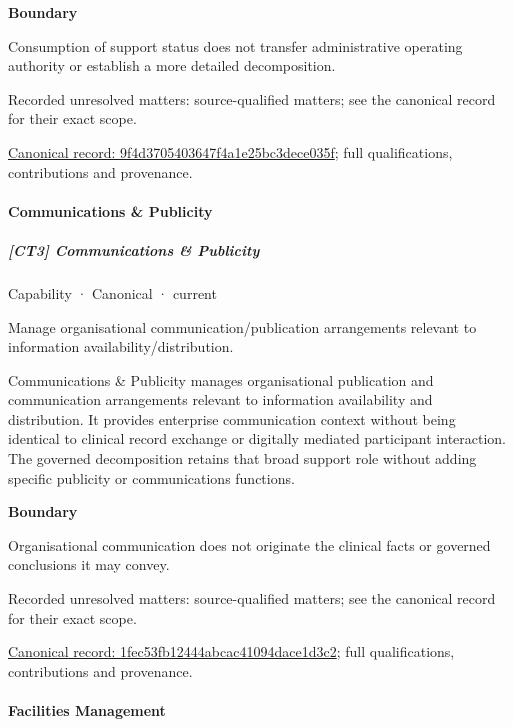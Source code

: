 \textbf{Boundary}



Consumption of support status does not transfer administrative operating authority or establish a more detailed decomposition.


{\small Recorded unresolved matters: source-qualified matters; see the canonical record for their exact scope.}\par
{\footnotesize \href{../../../../continuum/strategy/capability/9f4d3705403647f4a1e25bc3dece035f.md}{Canonical record: 9f4d3705403647f4a1e25bc3dece035f}; full qualifications, contributions and provenance.}\par
\paragraph{Communications \& Publicity}

\subparagraph{[CT3] Communications \& Publicity}

\label{element:1fec53fb12444abcac41094dace1d3c2}
{\small Capability · Canonical · current}\par

Manage organisational communication/publication arrangements relevant to information availability/distribution.



Communications \& Publicity manages organisational publication and communication arrangements relevant to information availability and distribution. It provides enterprise communication context without being identical to clinical record exchange or digitally mediated participant interaction. The governed decomposition retains that broad support role without adding specific publicity or communications functions.



\textbf{Boundary}



Organisational communication does not originate the clinical facts or governed conclusions it may convey.


{\small Recorded unresolved matters: source-qualified matters; see the canonical record for their exact scope.}\par
{\footnotesize \href{../../../../continuum/strategy/capability/1fec53fb12444abcac41094dace1d3c2.md}{Canonical record: 1fec53fb12444abcac41094dace1d3c2}; full qualifications, contributions and provenance.}\par
\paragraph{Facilities Management}

